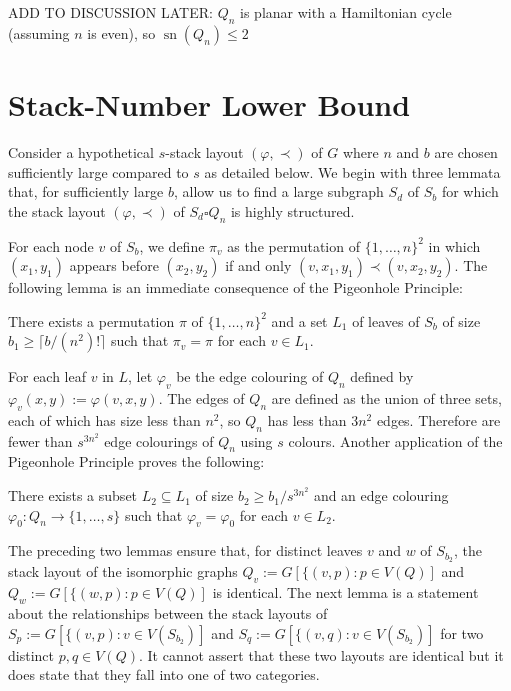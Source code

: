 \documentclass[kpfonts]{patmorin}
\DeclareMathOperator{\sn}{sn}
\renewcommand{\leq}{\leqslant}
\renewcommand{\ge}{\geqslant}
\begin{document}
ADD TO DISCUSSION LATER:	$Q_n$ is planar with a Hamiltonian cycle (assuming $n$ is even), so $\sn(Q_n) \leq 2$


\section{Stack-Number Lower Bound}

Consider a hypothetical $s$-stack layout $(\varphi,\prec)$ of $G$ where $n$ and $b$ are chosen sufficiently large compared to $s$ as detailed below.  We begin with three lemmata that, for sufficiently large $b$, allow us to find a large subgraph $S_d$ of $S_b$ for which the stack layout $(\varphi,\prec)$ of $S_d\square Q_n$ is highly structured.



For each node $v$ of $S_b$, we define $\pi_v$ as the permutation of $\{1,\ldots,n\}^2$ in which $(x_1,y_1)$ appears before $(x_2,y_2)$ if and only $(v,x_1,y_1)\prec (v,x_2,y_2)$.  The following lemma is an immediate consequence of the Pigeonhole Principle:

\begin{lem}
    There exists a permutation $\pi$ of $\{1,\ldots,n\}^2$ and a set $L_1$ of leaves of $S_b$ of size $b_1\ge \lceil b/(n^2)!\rceil$ such that $\pi_{v}=\pi$ for each $v\in L_1$.
\end{lem}

For each leaf $v$ in $L$, let $\varphi_v$ be the edge colouring of $Q_n$ defined by $\varphi_v(x,y):=\varphi(v,x,y)$.  The edges of $Q_n$ are defined as the union of three sets, each of which has size less than $n^2$, so $Q_n$ has less than $3n^2$ edges.  Therefore are fewer than $s^{3n^2}$ edge colourings of $Q_n$ using $s$ colours.  Another application of the Pigeonhole Principle proves the following:

\begin{lem}
    There exists a subset $L_2\subseteq L_1$ of size $b_2\ge b_1/s^{3n^2}$
    and an edge colouring $\varphi_0:Q_n\to\{1,\ldots,s\}$ such that $\varphi_v=\varphi_0$ for each $v\in L_2$.
\end{lem}

The preceding two lemmas ensure that, for distinct leaves $v$ and $w$ of $S_{b_2}$, the stack layout of the isomorphic graphs $Q_v:=G[\{(v,p):p\in V(Q)]$ and $Q_w:=G[\{(w,p):p\in V(Q)]$ is identical.  The next lemma is a statement about the relationships between the stack layouts of $S_p:=G[\{(v,p):v\in V(S_{b_2})]$ and $S_q:=G[\{(v,q):v\in V(S_{b_2})]$ for two distinct $p,q\in V(Q)$.  It cannot assert that these two layouts are identical but it does state that they fall into one of two categories.
\end{document}
